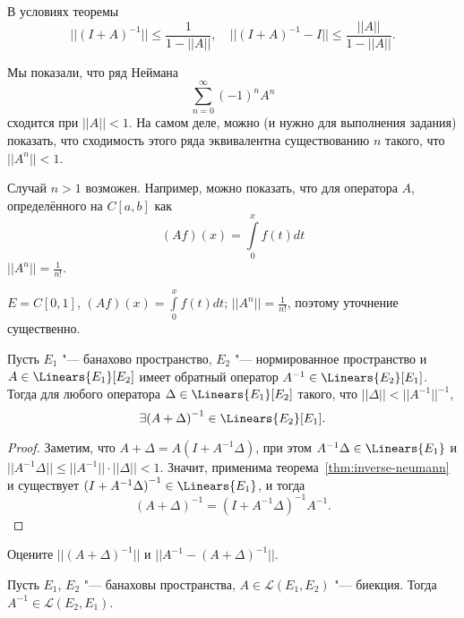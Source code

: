 \documentclass[main]{subfiles}
\begin{document}
\begin{corollary}
  В условиях теоремы
  \[
    ||(I + A)^{-1}|| \le \frac{1}{1 - ||A||}, \quad
    ||(I + A)^{-1} - I|| \le \frac{||A||}{1 - ||A||}.
  \]
\end{corollary}

\begin{remark}
  Мы показали, что ряд Неймана
  \[
    \sum_{n=0}^\infty (-1)^n A^n
  \]
  сходится при \( ||A|| < 1 \).
  На самом деле, можно (и нужно для выполнения задания)
  показать, что сходимость этого ряда эквивалентна
  существованию \( n \) такого, что \( ||A^n|| < 1 \).
\end{remark}

\begin{example}
  Случай \( n > 1 \) возможен.
  Например, можно показать, что для
  оператора \( A \),
  определённого на \( C[a, b] \) как
  \[
    (Af)(x) = \int\limits_0^x f(t) dt
  \]
  \( ||A^n|| = \frac{1}{n!} \).
\end{example}

\begin{example}
  \( E = C[0, 1] \), \( (Af)(x) = \int\limits_0^x f(t) dt \);
  \( ||A^n|| = \frac{1}{n!} \), поэтому уточнение существенно.
\end{example}

\begin{theorem} %
  Пусть \( E_1 \) "--- банахово пространство,
  \( E_2 \) "--- нормированное пространство
  и \( A \in \Linears{E_1}[E_2] \)
  имеет обратный оператор
  \( A^{-1} \in \Linears{E_2}[E_1] \).
  Тогда для любого оператора
  \( \Delta \in \Linears{E_1}[E_2] \)
  такого, что \( ||\Delta|| < ||A^{-1}||^{-1} \),
  \[
    \exists {(A + \Delta)}^{-1} \in \Linears{E_2}[E_1].
  \]
\end{theorem}
\begin{proof}
  Заметим, что
  \( A + \Delta = A (I + A^{-1} \Delta) \),
  при этом \( A^{-1} \Delta \in \Linears{E_1} \)
  и \( ||A^{-1} \Delta|| \le ||A^{-1}|| \cdot ||\Delta|| < 1 \).
  Значит, применима теорема~\ref{thm:inverse-neumann}
  и существует \( {(I + A^{-1} \Delta)}^{-1} \in \Linears{E_1} \),
  и тогда
  \[
    {(A + \Delta)}^{-1} = {(I + A^{-1} \Delta)}^{-1} A^{-1}.
  \]
\end{proof}

\begin{exercise}
  Оцените \( ||{(A + \Delta)}^{-1}|| \)
  и \( ||A^{-1} - {(A + \Delta)}^{-1}|| \).
\end{exercise}

\begin{theorem} %
  Пусть \( E_1 \), \( E_2 \) "--- банаховы пространства,
  \( A \in \mathcal{L}(E_1, E_2) \) "--- биекция.
  Тогда \( A^{-1} \in \mathcal{L}(E_2, E_1) \).
\end{theorem}
\end{document}
